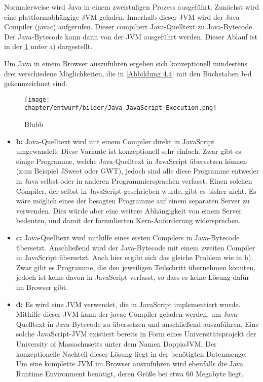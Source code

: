 Normalerweise wird Java in einem zweistufigen Prozess ausgeführt. Zunächst wird eine plattformabhängige JVM geladen. Innerhalb dieser JVM wird der Java-Compiler (javac) aufgerufen. Dieser compiliert Java-Quelltext zu Java-Bytecode. Der Java-Bytecode kann dann von der JVM ausgeführt werden. Dieser Ablauf ist in der \ref{abb:java_execution} unter a) dargestellt.

Um Java in einem Browser auszuführen ergeben sich konzeptionell mindestens drei verschiedene Möglichkeiten, die in \ref{Abbildung 4.4} mit den Buchstaben b-d gekennzeichnet sind.

\begin{figure}[H]
    \texttt{[image: chapter/entwurf/bilder/Java\_JavaScript\_Execution.png]}
    \centering
    \caption{Blubb}
    \label{abb:java_execution}
\end{figure}

\begin{itemize}
    \item \textbf{b:} Java-Quelltext wird mit einem Compiler direkt in JavaScript umgewandelt: Diese Variante ist konzeptionell sehr einfach. Zwar gibt es einige Programme, welche Java-Quelltext in JavaScript übersetzen können (zum Beispiel JSweet oder GWT), jedoch sind alle diese Programme entweder in Java selbst oder in anderen Programmiersprachen verfasst. Einen solchen Compiler, der selbst in JavaScript geschrieben wurde, gibt es bisher nicht. Es wäre möglich eines der besagten Programme auf einem separaten Server zu verwenden. Dies würde aber eine weitere Abhängigkeit von einem Server bedeuten, und damit der formulierten Kern-Anforderung widersprechen.
    \item \textbf{c:} Java-Quelltext wird mithilfe eines ersten Compilers in Java-Bytecode übersetzt. Anschließend wird der Java-Bytecode mit einem zweiten Compiler in JavaScript übersetzt. Auch hier ergibt sich das gleiche Problem wie in b). Zwar gibt es Programme, die den jeweiligen Teilschritt übernehmen könnten, jedoch ist keins davon in JavaScript verfasst, so dass es keine Lösung dafür im Browser gibt.
    \item \textbf{d:} Es wird eine JVM verwendet, die in JavaScript implementiert wurde. Mithilfe dieser JVM kann der javac-Compiler geladen werden, um Java-Quelltext in Java-Bytecode zu übersetzen und anschließend auszuführen. Eine solche JavaScript-JVM existiert bereits in Form eines Universitätsprojekt der University of Massachusetts unter dem Namen DoppioJVM. Der konzeptionelle Nachteil dieser Lösung liegt in der benötigten Datenmenge: Um eine komplette JVM im Browser auszuführen wird ebenfalls die Java Runtime Environment benötigt, deren Größe bei etwa 60 Megabyte liegt.
\end{itemize}

